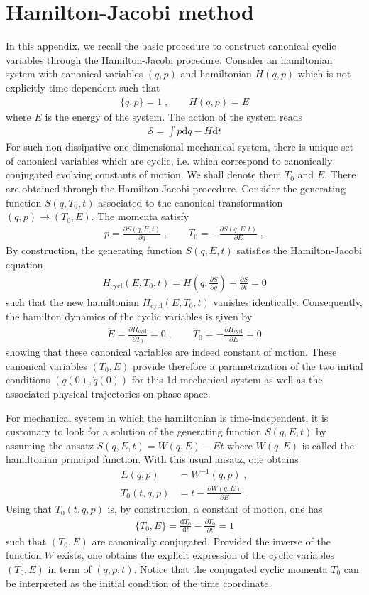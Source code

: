 \documentclass[onecolumn,notitlepage,superscriptaddress, nofootinbib,nobibnotes, aps,prd,10pt]{revtex4-1}%
\def\be{\begin{eqnarray}}
\def\ee{\end{eqnarray}}
\def\S{\mathcal{S}}
\def\dd{\mathrm{d}}
\begin{document}
\newpage
\appendix

\section{Hamilton-Jacobi method}

\label{HJM}

In this appendix, we recall the basic procedure to construct canonical cyclic variables through the Hamilton-Jacobi procedure. 
Consider an hamiltonian system with canonical variables $(q,p)$ and hamiltonian $H(q,p)$ which is not explicitly time-dependent such that
\be
\{ q, p\} =1\;, \qquad H(q,p) =E
\ee 
where $E$ is the energy of the system. 
The action of the system reads
\be
\label{action0}
\S = \int p \dd q - H \dd t
\ee
For such non dissipative one dimensional mechanical system, there is unique set of canonical variables which are cyclic, i.e. which correspond to canonically conjugated evolving constants of motion. We shall denote them $T_0$ and $E$. There are obtained through the Hamilton-Jacobi procedure. Consider the generating function $S(q, T_0, t)$ associated to the canonical transformation $(q,p) \rightarrow (T_0,E)$. The momenta satisfy
\be
p = \frac{\partial S(q,E, t)}{\partial q} \;, \qquad T_0 = - \frac{\partial S(q, E, t)}{\partial E} \;, 
\ee
By construction, the generating function $S(q, E, t)$ satisfies the Hamilton-Jacobi equation
\be
H_{\text{cycl}}(E, T_0, t) %
= H \left( q, \frac{\partial S}{\partial q} \right) + \frac{\partial S}{\partial t} = 0
\ee 
such that the new hamiltonian $H_{\text{cycl}}(E,T_0,t)$ vanishes identically. Consequently, the hamilton dynamics of the cyclic variables is given by
\be
\dot{E} = \frac{\partial H_{\text{cycl}}}{\partial T_0} = 0 \;, \qquad \dot{T}_0 = - \frac{\partial H_{\text{cycl}}}{\partial E} =0
\ee 
showing that these canonical variables are indeed constant of motion. These canonical variables $(T_0, E)$ provide therefore a parametrization of the two initial conditions $\left( q(0), \dot{q}(0)\right)$ for this 1d mechanical system as well as the associated physical trajectories on phase space. 

For mechanical system in which the hamiltonian is time-independent, it is customary to look for a solution of the generating function $S(q, E, t)$ by assuming the ansatz $S(q,E, t) = W(q,E) - E t$ where $W(q,E)$ is called the hamiltonian principal function. With this usual ansatz, one obtains
\begin{align}
E(q, p) & = W^{-1} (q, p) \;,\\
\label{P}
T_0(t,q, p) & = t - \frac{\partial W(q, E)}{\partial E}  \;.
\end{align}
Using that $T_0(t,q,p)$ is, by construction, a constant of motion, one has
\be
 \{T_0, E \} = \frac{\dd T_0}{\dd t} - \frac{\partial T_0}{\partial t} = 1
 \ee
 such that $(T_0, E)$ are canonically conjugated.
Provided the inverse of the function $W$ exists, one obtains the explicit expression of the cyclic variables $(T_0, E)$ in term of $(q,p, t)$. Notice that the conjugated cyclic momenta $T_0$ can be interpreted as the initial condition of the time coordinate.
\end{document}
